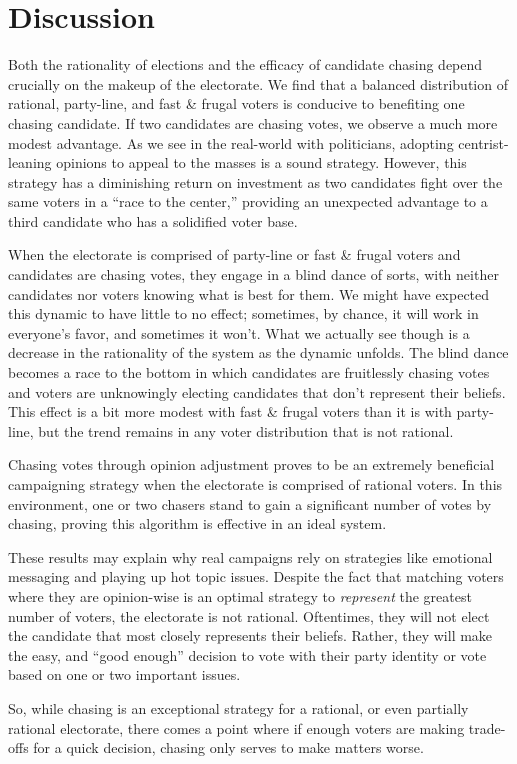 \section{Discussion}
\label{sec:discussion}

Both the rationality of elections and the efficacy of candidate chasing depend
crucially on the makeup of the electorate. We find that a balanced distribution
of rational, party-line, and fast \& frugal voters is conducive to benefiting
one chasing candidate. If two candidates are chasing votes, we observe a much
more modest advantage. As we see in the real-world with politicians, adopting
centrist-leaning opinions to appeal to the masses is a sound strategy. However,
this strategy has a diminishing return on investment as two candidates fight
over the same voters in a ``race to the center,'' providing an unexpected
advantage to a third candidate who has a solidified voter base.

When the electorate is comprised of party-line or fast \& frugal voters and
candidates are chasing votes, they engage in a blind dance of sorts, with
neither candidates nor voters knowing what is best for them. We might have
expected this dynamic to have little to no effect; sometimes, by chance,
it will work in everyone's favor, and sometimes it won't. What we actually
see though is a decrease in the rationality of the system as the dynamic
unfolds. The blind dance becomes a race to the bottom in which candidates
are fruitlessly chasing votes and voters are unknowingly electing candidates
that don't represent their beliefs. This effect is a bit more modest with
fast \& frugal voters than it is with party-line, but the trend remains
in any voter distribution that is not rational.

Chasing votes through opinion adjustment proves to be an extremely beneficial
campaigning strategy when the electorate is comprised of rational voters. In
this environment, one or two chasers stand to gain a significant number of
votes by chasing, proving this algorithm is effective in an ideal system.

These results may explain why real campaigns rely on strategies like emotional
messaging and playing up hot topic issues. Despite the fact that matching
voters where they are opinion-wise is an optimal strategy to \textit{represent} 
the greatest number of voters, the electorate is not rational. Oftentimes, they
will not elect the candidate that most closely represents their beliefs. Rather,
they will make the easy, and ``good enough'' decision to vote with their party
identity or vote based on one or two important issues. 

So, while chasing is an exceptional strategy for a rational, or even partially
rational electorate, there comes a point where if enough voters are making
trade-offs for a quick decision, chasing only serves to make matters worse. 
